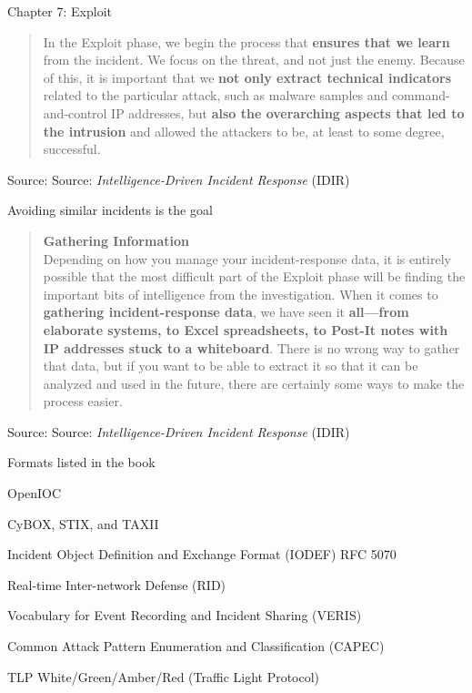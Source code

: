 \documentclass[Screen16to9,17pt]{foils}
\begin{document}
\begin{list2}
\item Chapter 7: Exploit
\end{list2}



\begin{quote}
In the Exploit phase, we begin the process that {\bf ensures that we learn} from the incident. We focus on the threat, and not just the enemy. Because of this, it is important that we {\bf not only extract technical indicators} related to the particular attack, such as malware samples and command-and-control IP addresses, but {\bf also the overarching aspects that led to the intrusion} and allowed the attackers to be, at least to some degree, successful.
\end{quote}
Source: Source: \emph{Intelligence-Driven Incident Response} (IDIR)

\begin{list2}
\item Avoiding similar incidents is the goal
\end{list2}




\begin{quote}
{\bf Gathering Information}\\
Depending on how you manage your incident-response data, it is entirely possible
that the most difficult part of the Exploit phase will be finding the important bits of
intelligence from the investigation. When it comes to {\bf gathering incident-response
data}, we have seen it {\bf all—from elaborate systems, to Excel spreadsheets, to Post-It
notes with IP addresses stuck to a whiteboard}. There is no wrong way to gather that
data, but if you want to be able to extract it so that it can be analyzed and used in the
future, there are certainly some ways to make the process easier.
\end{quote}
Source: Source: \emph{Intelligence-Driven Incident Response} (IDIR)



Formats listed in the book
\begin{list2}
\item OpenIOC
\item CyBOX, STIX, and TAXII
\item Incident Object Definition and Exchange Format (IODEF) RFC 5070
\item Real-time Inter-network Defense (RID)
\item Vocabulary for Event Recording and Incident Sharing (VERIS)
\item Common Attack Pattern Enumeration and Classification (CAPEC)
\item TLP White/Green/Amber/Red (Traffic Light Protocol)
\end{list2}
\end{document}
